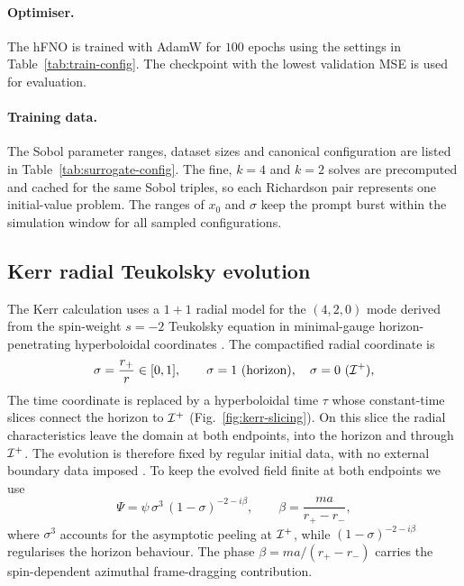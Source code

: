 \paragraph{Optimiser.} The hFNO is trained with AdamW for $100$ epochs
using the settings in Table~\ref{tab:train-config}. The checkpoint
with the lowest validation MSE is used for evaluation.

\paragraph{Training data.} The Sobol parameter ranges, dataset sizes
and canonical configuration are listed in
Table~\ref{tab:surrogate-config}. The fine, $k = 4$ and $k = 2$
solves are precomputed and cached for the same Sobol triples, so each
Richardson pair represents one initial-value problem. The ranges of
$x_0$ and $\sigma$ keep the prompt burst within the simulation window
for all sampled configurations.

\subsection{Kerr radial Teukolsky evolution}
\label{sec:teukolsky-numerics}

The Kerr calculation uses a $1+1$ radial model for the $(4,2,0)$ mode
derived from the spin-weight $s=-2$ Teukolsky equation in minimal-gauge
horizon-penetrating hyperboloidal coordinates
\citep{Zenginoglu2011,Harms2013,PanossoMacedo2020}. The compactified
radial coordinate is
\begin{equation}
  \sigma = \frac{r_{+}}{r} \in [0, 1],
  \qquad
  \sigma = 1 \ \text{(horizon)}, \quad
  \sigma = 0 \ (\mathcal{I}^{+}),
  \label{eq:kerr-sigma}
\end{equation}
The time coordinate is replaced by a hyperboloidal time $\tau$ whose
constant-time slices connect the horizon to $\mathcal{I}^{+}$
(Fig.~\ref{fig:kerr-slicing}). On this slice the radial
characteristics leave the domain at both endpoints, into the horizon
and through $\mathcal{I}^{+}$. The evolution is therefore fixed by regular
initial data, with no external boundary data imposed
\citep{Harms2013,PanossoMacedo2020}. To keep the evolved field finite
at both endpoints we use
\begin{equation}
  \Psi = \psi\,\sigma^{3}\,(1 - \sigma)^{-2 - i\beta},
  \qquad
  \beta = \frac{m a}{r_{+} - r_{-}},
  \label{eq:kerr-rescale}
\end{equation}
where $\sigma^3$ accounts for the asymptotic peeling at $\mathcal{I}^{+}$, while
$(1-\sigma)^{-2-i\beta}$ regularises the horizon behaviour. The phase
$\beta = ma/(r_+-r_-)$ carries the spin-dependent azimuthal
frame-dragging contribution.

